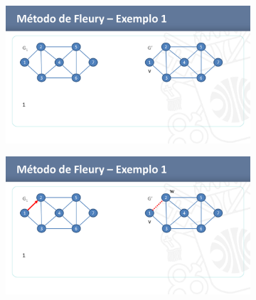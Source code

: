 \begin{figure}[htbp]
	\begin{subfigure}{.4\textwidth}
		\centering
		\includegraphics[width=\textwidth]{imagem/graficos/1a1455b7b9174768d1c6a0d41673e79dHTztESkzBtQzsXWu-25.png}
	\end{subfigure}
	\begin{subfigure}{.4\textwidth}
		\centering
		\includegraphics[width=\textwidth]{imagem/graficos/1a1455b7b9174768d1c6a0d41673e79dHTztESkzBtQzsXWu-26.png}
	\end{subfigure}
\end{figure}
